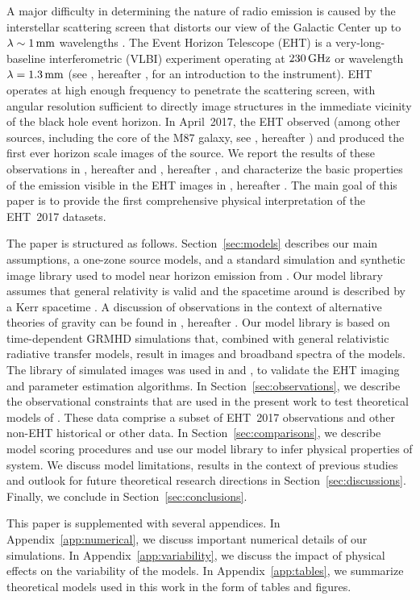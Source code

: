 A major difficulty in determining the nature of \sgra radio emission is caused by the interstellar scattering screen that distorts our view of the Galactic Center up to $\lambda \sim 1\,\mathrm{mm}$ wavelengths
\citep[see][and references therein]{2018arXiv180501242P, 2018ApJ...865..104J,2019ApJ...871...30I}.
The Event Horizon Telescope (EHT) is a very-long-baseline interferometric (VLBI) experiment operating at $230\,\mathrm{GHz}$ or wavelength $\lambda = 1.3\,\mathrm{mm}$ (see \citealt{M87PaperII}, hereafter , for an introduction to the instrument).
EHT operates at high enough frequency to penetrate the scattering screen, with angular resolution sufficient to directly image structures in the immediate vicinity of the black hole event horizon.
In April~2017, the EHT observed \sgra (among other sources, including the core of the M87 galaxy, see \citealt{M87PaperI}, hereafter ) and produced the first ever horizon scale images of the source.
We report the results of these observations in \citet{PaperII}, hereafter  and \citet{PaperIII}, hereafter , and characterize the basic properties of the emission visible in the EHT images in \citealt{PaperIV}, hereafter .
The main goal of this paper  is to provide the first comprehensive physical interpretation of the EHT~2017 \sgra datasets.

The paper is structured as follows.
Section~\ref{sec:models} describes our main assumptions, a one-zone source models, and a standard simulation and synthetic image library used to model near horizon emission from \sgra.
Our model library assumes that general relativity is valid and the spacetime around \sgra is described by a Kerr spacetime \citep{1963PhRvL..11..237K}.
A discussion of \sgra observations in the context of alternative theories of gravity can be found in  \citet{PaperVI}, hereafter .
Our model library is based on time-dependent GRMHD simulations that, combined with general relativistic radiative transfer models, result in images and broadband spectra of the models.
The library of simulated images was used in  and , to validate the \sgra EHT imaging and parameter estimation algorithms.
In Section~\ref{sec:observations}, we describe the  observational constraints that are used in the present work to test theoretical models of \sgra.
These data comprise a subset of EHT~2017 observations and other non-EHT historical or other data.
In Section~\ref{sec:comparisons}, we describe model scoring procedures and use our model library to infer physical properties of \sgra system.
We discuss model limitations, results in the context of previous studies and outlook for future \sgra theoretical research directions in Section~\ref{sec:discussions}.
Finally, we conclude in Section~\ref{sec:conclusions}.

This paper is supplemented with several appendices.
In Appendix~\ref{app:numerical},   we discuss important numerical details of our simulations.
In Appendix~\ref{app:variability}, we discuss the impact of physical effects on the variability of the models.
In Appendix~\ref{app:tables},      we summarize theoretical models used in this work in the form of tables and figures.
